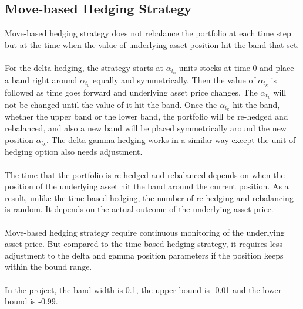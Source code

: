 \documentclass[12pt]{article}
\begin{document}
\subsection{Move-based Hedging Strategy}
Move-based hedging strategy does not rebalance the portfolio at each time step but at the time when the value of underlying asset position hit the band that set.\\
\\For the delta hedging, the strategy starts at ${\alpha_{t_0}}$ units stocks at time 0 and place a band right around ${\alpha_{t_0}}$ equally and symmetrically. Then the value of ${\alpha_{t_k}}$ is followed as time goes forward and underlying asset price changes. The ${\alpha_{t_k}}$ will not be changed until the value of it hit the band. Once the ${\alpha_{t_k}}$ hit the band, whether the upper band or the lower band, the portfolio will be re-hedged and rebalanced, and also a new band will be placed symmetrically around the new position ${\alpha_{t_k}}$. The delta-gamma hedging works in a similar way except the unit of hedging option also needs adjustment.\\
\\The time that the portfolio is re-hedged and rebalanced depends on when the position of the underlying asset hit the band around the current position. As a result, unlike the time-based hedging, the number of re-hedging and rebalancing is random. It depends on the actual outcome of the underlying asset price.\\
\\Move-based hedging strategy require continuous monitoring of the underlying asset price. But compared to the time-based hedging strategy, it requires less adjustment to the delta and gamma position parameters if the position keeps within the bound range.\\
\\In the project, the band width is 0.1, the upper bound is -0.01 and the lower bound is -0.99.
\end{document}
